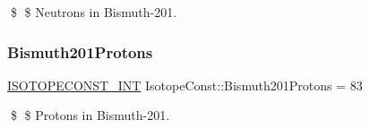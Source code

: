 \$ \$ Neutrons in Bismuth-\/201. \mbox{\label{group___isotope_const-_bismuth-_bi201_ga7efcd17c4d423a66e1bc256293ab3020}} 
\subsubsection{\texorpdfstring{Bismuth201\+Protons}{Bismuth201Protons}}
{\footnotesize\ttfamily \mbox{\hyperlink{group___isotope_const-_macros_ga5f18360b3e99483a35c32d789e62621c}{I\+S\+O\+T\+O\+P\+E\+C\+O\+N\+S\+T\+\_\+\+I\+NT}} Isotope\+Const\+::\+Bismuth201\+Protons = 83}

\$ \$ Protons in Bismuth-\/201. 